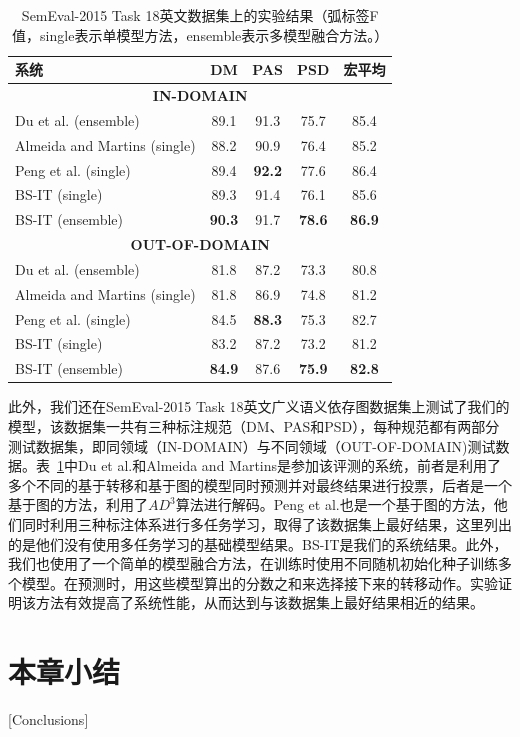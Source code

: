 \begin{table}[htpb]
	\centering
	\small
	\renewcommand{\arraystretch}{1.2}
	\begin{tabular}{l||ccc|c}
		\hline
		\bf 系统&\bf DM&\bf PAS&\bf PSD &\bf 宏平均\\
		\hline
		\multicolumn{5}{c}{\bf IN-DOMAIN}\\
		\hline
		Du et al.\cite{du-EtAl:2015:SemEval} (ensemble) &89.1&91.3&75.7&85.4\\
		Almeida and Martins\cite{almeida-martins:2015:SemEval} (single) &88.2&90.9&76.4&85.2\\
		Peng et al.\cite{peng-thomson-smith:2017:Long} (single) &89.4&\bf 92.2&77.6&86.4\\
		\hline
		BS-IT (single) &89.3&91.4&76.1&85.6\\
		BS-IT (ensemble) &\bf 90.3& 91.7&\bf 78.6&\bf 86.9\\
		\hline
		\multicolumn{5}{c}{\bf OUT-OF-DOMAIN}\\
		\hline
		Du et al.\cite{du-EtAl:2015:SemEval} (ensemble) &81.8&87.2&73.3&80.8\\
		Almeida and Martins\cite{almeida-martins:2015:SemEval} (single) &81.8&86.9&74.8&81.2\\
		Peng et al.\cite{peng-thomson-smith:2017:Long} (single) &84.5&\bf 88.3&75.3&82.7\\
		\hline
		BS-IT  (single) &83.2&87.2&73.2&81.2\\
		BS-IT (ensemble) &\bf 84.9&87.6&\bf 75.9&\bf 82.8\\
		\hline
	\end{tabular}
	\caption{SemEval-2015 Task 18英文数据集上的实验结果（弧标签F值，single表示单模型方法，ensemble表示多模型融合方法。）}
	\label{tbl:result-semeval15}
\end{table}

此外，我们还在SemEval-2015 Task 18英文广义语义依存图数据集上测试了我们的模型，该数据集一共有三种标注规范（DM、PAS和PSD），每种规范都有两部分测试数据集，即同领域（IN-DOMAIN）与不同领域（OUT-OF-DOMAIN)测试数据。表~\ref{tbl:result-semeval15}中Du et al.\cite{du-EtAl:2015:SemEval}和Almeida and Martins\cite{almeida-martins:2015:SemEval}是参加该评测的系统，前者是利用了多个不同的基于转移和基于图的模型同时预测并对最终结果进行投票，后者是一个基于图的方法，利用了$AD^3$算法进行解码。Peng et al.\cite{peng-thomson-smith:2017:Long}也是一个基于图的方法，他们同时利用三种标注体系进行多任务学习，取得了该数据集上最好结果，这里列出的是他们没有使用多任务学习的基础模型结果。BS-IT是我们的系统结果。此外，我们也使用了一个简单的模型融合方法，在训练时使用不同随机初始化种子训练多个模型。在预测时，用这些模型算出的分数之和来选择接下来的转移动作。实验证明该方法有效提高了系统性能，从而达到与该数据集上最好结果相近的结果。



\section{本章小结}[Conclusions]


